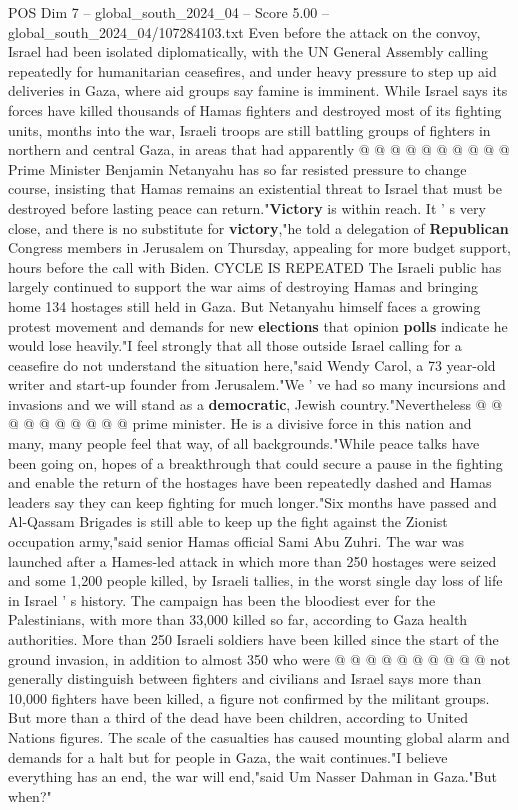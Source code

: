 \begin{textsample}{POS Dim 7 – global\_south\_2024\_04 – Score 5.00 – global\_south\_2024\_04/107284103.txt}
Even before the attack on the convoy, Israel had been isolated diplomatically, with the UN General Assembly calling repeatedly for humanitarian ceasefires, and under heavy pressure to step up aid deliveries in Gaza, where aid groups say famine is imminent.
While Israel says its forces have killed thousands of Hamas fighters and destroyed most of its fighting units, months into the war, Israeli troops are still battling groups of fighters in northern and central Gaza, in areas that had apparently @ @ @ @ @ @ @ @ @ @ Prime Minister Benjamin Netanyahu has so far resisted pressure to change course, insisting that Hamas remains an existential threat to Israel that must be destroyed before lasting peace can return."\textbf{Victory} is within reach.
It ' s very close, and there is no substitute for \textbf{victory},"he told a delegation of \textbf{Republican} Congress members in Jerusalem on Thursday, appealing for more budget support, hours before the call with Biden.
CYCLE IS REPEATED The Israeli public has largely continued to support the war aims of destroying Hamas and bringing home 134 hostages still held in Gaza.
But Netanyahu himself faces a growing protest movement and demands for new \textbf{elections} that opinion \textbf{polls} indicate he would lose heavily."I feel strongly that all those outside Israel calling for a ceasefire do not understand the situation here,"said Wendy Carol, a 73 year-old writer and start-up founder from Jerusalem."We ' ve had so many incursions and invasions and we will stand as a \textbf{democratic}, Jewish country."Nevertheless @ @ @ @ @ @ @ @ @ @ prime minister.
He is a divisive force in this nation and many, many people feel that way, of all backgrounds."While peace talks have been going on, hopes of a breakthrough that could secure a pause in the fighting and enable the return of the hostages have been repeatedly dashed and Hamas leaders say they can keep fighting for much longer."Six months have passed and Al-Qassam Brigades is still able to keep up the fight against the Zionist occupation army,"said senior Hamas official Sami Abu Zuhri.
The war was launched after a Hames-led attack in which more than 250 hostages were seized and some 1,200 people killed, by Israeli tallies, in the worst single day loss of life in Israel ' s history.
The campaign has been the bloodiest ever for the Palestinians, with more than 33,000 killed so far, according to Gaza health authorities.
More than 250 Israeli soldiers have been killed since the start of the ground invasion, in addition to almost 350 who were @ @ @ @ @ @ @ @ @ @ not generally distinguish between fighters and civilians and Israel says more than 10,000 fighters have been killed, a figure not confirmed by the militant groups.
But more than a third of the dead have been children, according to United Nations figures.
The scale of the casualties has caused mounting global alarm and demands for a halt but for people in Gaza, the wait continues."I believe everything has an end, the war will end,"said Um Nasser Dahman in Gaza."But when?"

\end{textsample}
